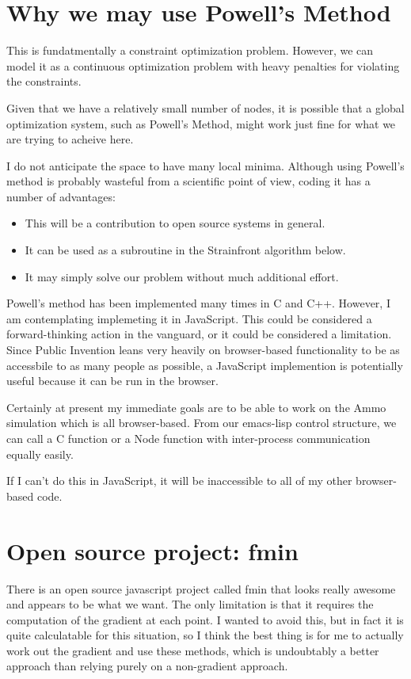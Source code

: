 \documentclass[11pt]{article}
\begin{document}
\section{Why we may use Powell's Method}

This is fundatmentally a constraint optimization problem. However, we can model it as a continuous
optimization problem with heavy penalties for violating the constraints.

Given that we have a relatively small number of nodes, it is possible that a global optimization
system, such as Powell's Method, might work just fine for what we are trying to acheive here.

I do not anticipate the space to have many local minima. Although using Powell's method
is probably wasteful from a scientific point of view, coding it has a number of advantages:
\begin{itemize}
\item This will be a contribution to open source systems in general.
\item It can be used as a subroutine in the Strainfront algorithm below.
  \item It may simply solve our problem without much additional effort.
\end{itemize}

Powell's method has been implemented many times in C and C++. However, I am contemplating
implemeting it in JavaScript.  This could be considered a forward-thinking action in the vanguard,
or it could be considered a limitation.  Since Public Invention leans very heavily on browser-based
functionality to be as accessbile to as many people as possible, a JavaScript implemention is
potentially useful because it can be run in the  browser.

Certainly at present my immediate goals are to be able to work on the Ammo simulation which
is all browser-based.  From our emacs-lisp control structure, we can call a C function
or a Node function with inter-process communication equally easily.

If I can't do this in JavaScript, it will be inaccessible to all of my other browser-based
code.

\section{Open source project: fmin}

There is an open source javascript project called fmin that looks really awesome and appears to
be what we want.  The only limitation is that it requires the computation of the gradient at
each point.  I wanted to avoid this, but in fact it is quite calculatable for this situation,
so I think the best thing is for me to actually work out the gradient and use these methods,
which is undoubtably a better approach than relying purely on a non-gradient approach.
\end{document}
